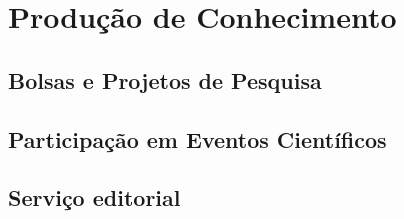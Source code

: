 \section{Produção de Conhecimento}
\label{sec:producao}  
\subsection{Bolsas e Projetos de Pesquisa}
\label{subsec:bolsas}  

\lipsum[28-29]

\subsection{Participação em Eventos Científicos}
\label{subsec:eventos}  

\lipsum[30-31]

\subsection{Serviço editorial}
\label{subsec:editorial}  

\lipsum[32-33]

